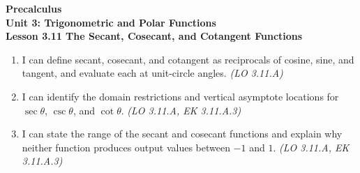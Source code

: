 \documentclass[10pt]{article}
\begin{document}
\vspace{-0.8in}

\begin{center}
  {\color{white}\textbf{\LARGE Precalculus}}\\[4pt]
  {\color{skymid}\large\textbf{Unit 3: Trigonometric and Polar Functions}}\\[6pt]
  {\color{white}\textbf{\large Lesson 3.11 \quad The Secant, Cosecant, and Cotangent Functions}}
\end{center}

\vspace{0.22in}
\namedateperiod
\vspace{0.18in}

\begin{learningtargetbox}
\small
\begin{enumerate}[leftmargin=1.5em, itemsep=5pt]
  \item I can define secant, cosecant, and cotangent as reciprocals of cosine,
    sine, and tangent, and evaluate each at unit-circle angles.
    \hfill\textit{(LO 3.11.A)}
  \item I can identify the domain restrictions and vertical asymptote locations
    for $\sec\theta$, $\csc\theta$, and $\cot\theta$.
    \hfill\textit{(LO 3.11.A, EK 3.11.A.3)}
  \item I can state the range of the secant and cosecant functions and explain
    why neither function produces output values between $-1$ and $1$.
    \hfill\textit{(LO 3.11.A, EK 3.11.A.3)}
\end{enumerate}
\end{learningtargetbox}

\vspace{0.14in}
\end{document}
